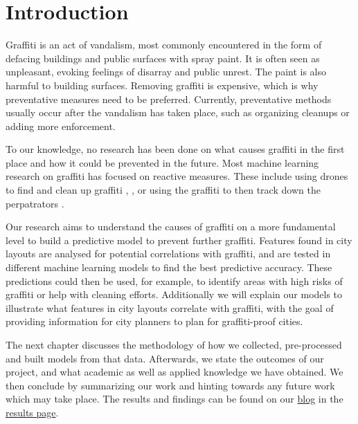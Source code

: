 \chapter{Introduction}


Graffiti is an act of vandalism, most commonly encountered in the form of defacing buildings and public surfaces with spray paint. It is often seen as unpleasant, evoking feelings of disarray and public unrest. The paint is also harmful to building surfaces. Removing graffiti is expensive, which is why preventative measures need to be preferred. Currently, preventative methods usually occur after the vandalism has taken place, such as organizing cleanups or adding more enforcement.

To our knowledge, no research has been done on what causes graffiti in the first place and how it could be prevented in the future. Most machine learning research on graffiti has focused on reactive measures. These include using drones to find and clean up graffiti \cite{uav}, \cite{drone}, or using the graffiti to then track down the perpatrators \cite{gang}.

Our research aims to understand the causes of graffiti on a more fundamental level to build a predictive model to prevent further graffiti. Features found in city layouts are analysed for potential correlations with graffiti, and are tested in different machine learning models to find the best predictive accuracy. These predictions could then be used, for example, to identify areas with high risks of graffiti or help with cleaning efforts. Additionally we will explain our models to illustrate what features in city layouts correlate with graffiti, with the goal of providing information for city planners to plan for graffiti-proof cities.

The next chapter discusses the methodology of how we collected, pre-processed and built models from that data. Afterwards, we state the outcomes of our project, and what academic as well as applied knowledge we have obtained. We then conclude by summarizing our work and hinting towards any future work which may take place. The results and findings can be found on our \href{https://cowkeyman.github.io/PredictingGraffitiUsingCityLayouts/}{blog} in the \href{https://cowkeyman.github.io/PredictingGraffitiUsingCityLayouts/results.html}{results page}.

